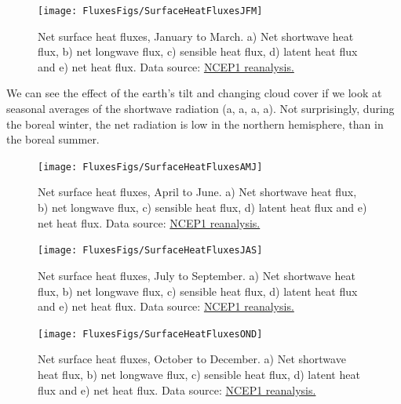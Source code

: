 \begin{figure}[htb]
  \centering
  \texttt{[image: FluxesFigs/SurfaceHeatFluxesJFM]}
  \caption{Net surface heat fluxes, January to March.  a) Net shortwave heat flux, b) net longwave flux, c) sensible heat flux, d) latent heat flux and e) net heat flux. 
  Data source:  \href{https://psl.noaa.gov/data/gridded/data.ncep.reanalysis.derived.surfaceflux.html}{NCEP1 reanalysis.}  }
  \label{fig:SurfaceHeatFluxesJFM}
\end{figure}

We can see the effect of the earth's tilt and changing cloud cover if we look at seasonal averages of the shortwave radiation (a, a, a, a).  Not surprisingly, during the boreal winter, the net radiation is low in the northern hemisphere, than in the boreal summer.  

\begin{figure}[htb]
  \centering
  \texttt{[image: FluxesFigs/SurfaceHeatFluxesAMJ]}
  \caption{Net surface heat fluxes, April to June.  a) Net shortwave heat flux, b) net longwave flux, c) sensible heat flux, d) latent heat flux and e) net heat flux. 
  Data source:  \href{https://psl.noaa.gov/data/gridded/data.ncep.reanalysis.derived.surfaceflux.html}{NCEP1 reanalysis.}  }
  \label{fig:SurfaceHeatFluxesAMJ}
\end{figure}

\begin{figure}[htb]
  \centering
  \texttt{[image: FluxesFigs/SurfaceHeatFluxesJAS]}
  \caption{Net surface heat fluxes, July to September.  a) Net shortwave heat flux, b) net longwave flux, c) sensible heat flux, d) latent heat flux and e) net heat flux. 
  Data source:  \href{https://psl.noaa.gov/data/gridded/data.ncep.reanalysis.derived.surfaceflux.html}{NCEP1 reanalysis.}  }
  \label{fig:SurfaceHeatFluxesJAS}
\end{figure}

\begin{figure}[htb]
  \centering
  \texttt{[image: FluxesFigs/SurfaceHeatFluxesOND]}
  \caption{Net surface heat fluxes, October to December.  a) Net shortwave heat flux, b) net longwave flux, c) sensible heat flux, d) latent heat flux and e) net heat flux. 
  Data source:  \href{https://psl.noaa.gov/data/gridded/data.ncep.reanalysis.derived.surfaceflux.html}{NCEP1 reanalysis.}  }
  \label{fig:SurfaceHeatFluxesOND}
\end{figure}
\clearpage

